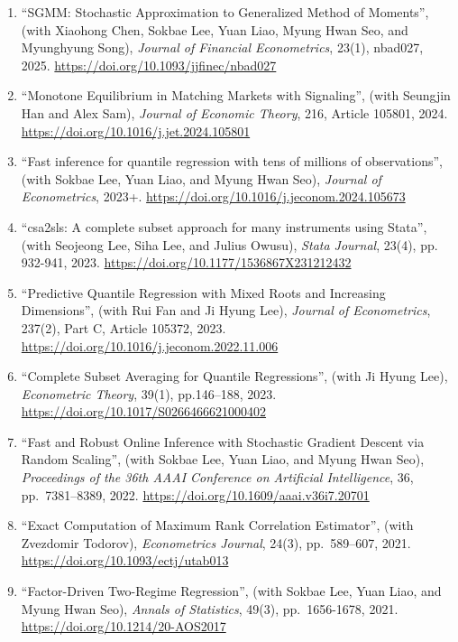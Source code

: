 \documentclass[12pt]{article}
\begin{document}
\begin{enumerate}
\item ``SGMM: Stochastic Approximation to Generalized Method of Moments'', (with Xiaohong Chen, Sokbae Lee, Yuan Liao, Myung Hwan Seo, and Myunghyung Song), \emph{Journal of Financial Econometrics}, 23(1), nbad027, 2025. \url{https://doi.org/10.1093/jjfinec/nbad027}

\item {``Monotone Equilibrium in Matching Markets with Signaling''}, (with Seungjin Han and Alex Sam), \emph{Journal of Economic Theory}, 216, Article 105801, 2024. \url{https://doi.org/10.1016/j.jet.2024.105801}

\item ``Fast inference for quantile regression with tens of millions of observations'', (with Sokbae Lee, Yuan Liao, and Myung Hwan Seo), \emph{Journal of Econometrics}, 2023+. \url{https://doi.org/10.1016/j.jeconom.2024.105673}

\item ``csa2sls: A complete subset approach for many instruments using Stata'', (with Seojeong Lee, Siha Lee, and Julius Owusu), \emph{Stata Journal}, 23(4), pp. 932-941, 2023. \url{https://doi.org/10.1177/1536867X231212432}

\item ``Predictive Quantile Regression with Mixed Roots and Increasing Dimensions'', (with Rui Fan and Ji Hyung Lee), \emph{Journal of Econometrics}, 237(2), Part C, Article 105372, 2023. \url{https://doi.org/10.1016/j.jeconom.2022.11.006}

\item ``Complete Subset Averaging for Quantile Regressions'',  (with Ji Hyung Lee), \textit{Econometric Theory}, 39(1), pp.146--188, 2023. \url{https://doi.org/10.1017/S0266466621000402}

\item ``Fast and Robust Online Inference with Stochastic Gradient Descent via Random Scaling'', (with Sokbae Lee, Yuan Liao, and Myung Hwan Seo), \textit{Proceedings of the 36th AAAI Conference on Artificial Intelligence}, 36, pp.\ 7381--8389, 2022. \url{https://doi.org/10.1609/aaai.v36i7.20701}

\item ``Exact Computation of Maximum Rank Correlation Estimator'', (with Zvezdomir Todorov), \textit{Econometrics Journal}, 24(3), pp.\ 589--607, 2021. \url{https://doi.org/10.1093/ectj/utab013}

\item ``Factor-Driven Two-Regime Regression'', (with Sokbae Lee, Yuan Liao, and Myung Hwan Seo), \textit{Annals of Statistics}, 49(3), pp.\ 1656-1678, 2021. \url{https://doi.org/10.1214/20-AOS2017}


\end{enumerate}
\end{document}

